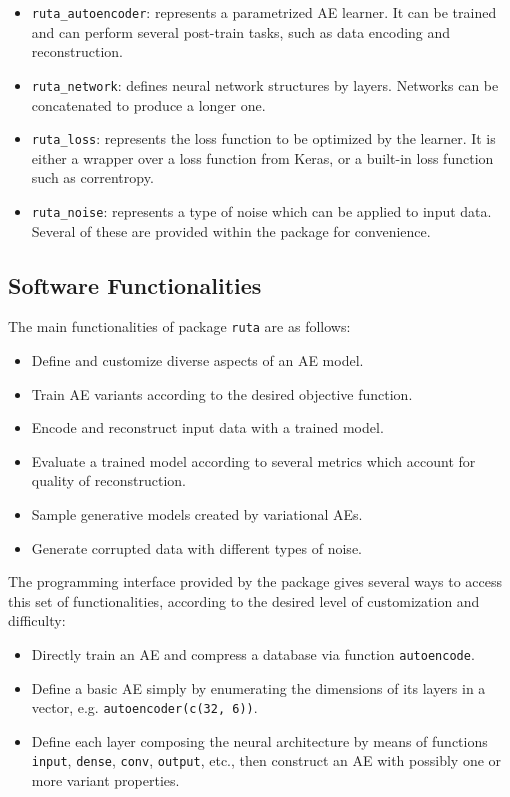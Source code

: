  \begin{itemize}
  \item \texttt{ruta\_autoencoder}: represents a parametrized AE learner. It can be trained and can perform several post-train tasks, such as data encoding and reconstruction.
  \item \texttt{ruta\_network}: defines neural network structures by layers. Networks can be concatenated to produce a longer one.
  \item \texttt{ruta\_loss}: represents the loss function to be optimized by the learner. It is either a wrapper over a loss function from Keras, or a built-in loss function such as correntropy.
  \item \texttt{ruta\_noise}: represents a type of noise which can be applied to input data. Several of these are provided within the package for convenience.
  \end{itemize}


  
\subsection{Software Functionalities}
\label{p2sec.functionality}

The main functionalities of package \texttt{ruta} are as follows:

\begin{itemize}
  \item Define and customize diverse aspects of an AE model.
\item Train AE variants according to the desired objective function.
\item Encode and reconstruct input data with a trained model.
\item Evaluate a trained model according to several metrics which account for quality of reconstruction.
\item Sample generative models created by variational AEs.
  \item Generate corrupted data with different types of noise.
\end{itemize}

The programming interface provided by the package gives several ways to access this set of functionalities, according to the desired level of customization and difficulty:

\begin{itemize}
\item Directly train an AE and compress a database via function \texttt{autoencode}.
\item Define a basic AE simply by enumerating the dimensions of its layers in a vector, e.g. \texttt{autoencoder(c(32, 6))}.
  \item Define each layer composing the neural architecture by means of functions \texttt{input}, \texttt{dense}, {\texttt{conv},} \texttt{output}, etc., then construct an AE with possibly one or more variant properties.
\end{itemize}

